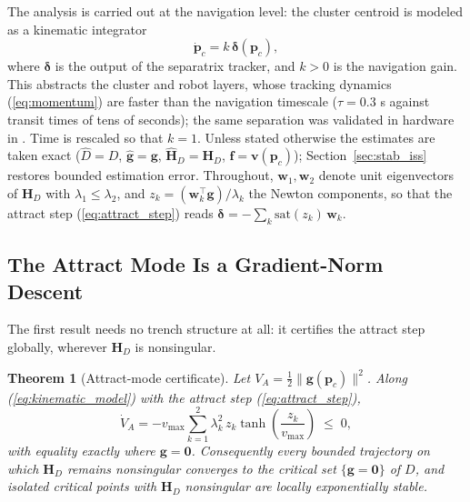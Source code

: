 \documentclass[lettersize,journal]{IEEEtran}
\newtheorem{theorem}{Theorem}
\begin{document}
The analysis is carried out at the navigation level: the cluster
centroid is modeled as a kinematic integrator
\begin{equation}
    \dot{\mathbf{p}}_c = k\,\boldsymbol{\delta}(\mathbf{p}_c),
    \label{eq:kinematic_model}
\end{equation}
where $\boldsymbol{\delta}$ is the output of the separatrix tracker,
and $k > 0$ is the navigation gain. This abstracts the cluster and
robot layers, whose
tracking dynamics (\ref{eq:momentum}) are faster than the navigation
timescale ($\tau = 0.3$ s against transit times of tens of seconds);
the same separation was validated in hardware in \cite{14}. Time is rescaled
so that $k = 1$. Unless stated otherwise the estimates are taken exact
($\hat{D} = D$, $\hat{\mathbf{g}} = \mathbf{g}$, $\hat{\mathbf{H}}_D =
\mathbf{H}_D$, $\mathbf{f} = \mathbf{v}(\mathbf{p}_c)$);
Section~\ref{sec:stab_iss} restores bounded estimation error.
Throughout, $\mathbf{w}_1, \mathbf{w}_2$ denote unit eigenvectors of
$\mathbf{H}_D$ with $\lambda_1 \leq \lambda_2$, and $z_k =
(\mathbf{w}_k^\top \mathbf{g})/\lambda_k$ the Newton components, so
that the attract step (\ref{eq:attract_step}) reads
$\boldsymbol{\delta} = -\sum_k \mathrm{sat}(z_k)\,\mathbf{w}_k$.

\subsection{The Attract Mode Is a Gradient-Norm Descent}

The first result needs no trench structure at all: it certifies the attract step
globally, wherever $\mathbf{H}_D$ is nonsingular.

\begin{theorem}[Attract-mode certificate]
\label{thm:attract}
Let $V_A = \tfrac{1}{2}\|\mathbf{g}(\mathbf{p}_c)\|^2$. Along
(\ref{eq:kinematic_model}) with the attract step
(\ref{eq:attract_step}),
\begin{equation}
    \dot{V}_A = -v_{\max} \sum_{k=1}^{2} \lambda_k^2\,
    z_k \tanh\!\left(\frac{z_k}{v_{\max}}\right) \;\leq\; 0,
    \label{eq:VA_dot}
\end{equation}
with equality exactly where $\mathbf{g} = \mathbf{0}$. Consequently
every bounded trajectory on which $\mathbf{H}_D$ remains nonsingular
converges to the critical set $\{\mathbf{g} = \mathbf{0}\}$ of $D$, and
isolated critical points with $\mathbf{H}_D$ nonsingular are locally
exponentially stable.
\end{theorem}
\end{document}
